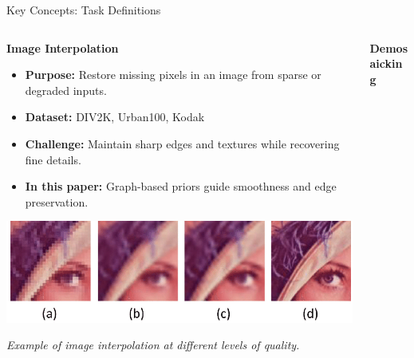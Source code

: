 \documentclass[aspectratio=169,xcolor=dvipsnames]{beamer}
\begin{document}
\begin{frame}{Key Concepts: Task Definitions}

\begin{columns}[c]

\begin{column}{0.5\textwidth}
\textbf{Image Interpolation}

\vspace{0.2cm}

\begin{itemize}
    \item \textbf{Purpose:} Restore missing pixels in an image from sparse or degraded inputs.
    \item \textbf{Dataset:} DIV2K, Urban100, Kodak
    \item \textbf{Challenge:} Maintain sharp edges and textures while recovering fine details.
    \item \textbf{In this paper:} Graph-based priors guide smoothness and edge preservation.
\end{itemize}

\begin{center}
    \includegraphics[width=0.9\linewidth]{Image Interpolation.png}
    
    \tiny \textit{Example of image interpolation at different levels of quality.}
\end{center}

\end{column}

\begin{column}{0.50\textwidth}
\textbf{Demosaicking}

\vspace{0.2cm}


\end{column}
\end{columns}
\end{frame}
\end{document}
